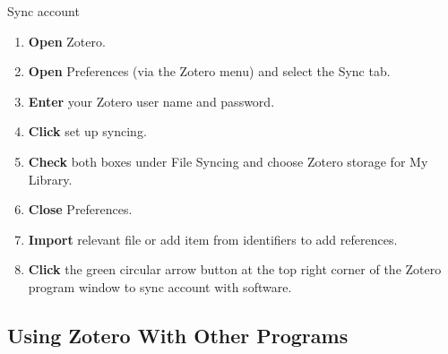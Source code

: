 \documentclass[10pt,a4paper]{article}
\begin{document}
\begin{textbox}{Sync account}
 

  

\begin{enumerate}
\item \textbf{Open} Zotero.
\item \textbf{Open} Preferences (via the Zotero menu) and select the Sync tab.
\item \textbf {Enter} your Zotero user name and password.
\item \textbf {Click} set up syncing.
\item \textbf {Check} both boxes under File Syncing and choose Zotero storage for My Library.
\item \textbf {Close} Preferences.
\item \textbf {Import} relevant file or add item from identifiers to add references.
\item \textbf {Click} the green circular arrow button at the top right corner of the Zotero program window to sync account with software.
\end{enumerate}

\end{textbox}

\subsection{Using Zotero With Other Programs}
\end{document}
